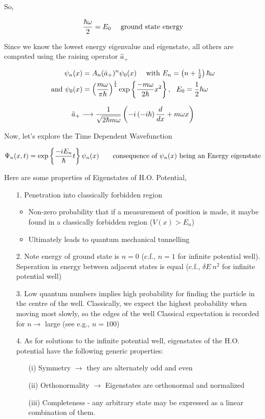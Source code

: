 \documentclass[english, 11pt]{article}
\begin{document}
       So,

       \[ \f{\hbar\omega}{2} = E_0 \ \ \ \ \mbox{ground state energy} \]

       Since we know the lowest energy eigenvalue and eigenstate, all others are computed using the raising operator $\hat{a}_+$

       \begin{align*}
         \psi_n(x) & = A_n (\hat{a}_+)^n\psi_0(x) \ \ \ \ \mbox{with $E_n = \left( n + \frac{1}{2} \right) \hbar \omega$} \\
         \mbox{and } \psi_0(x) & = \left( \frac{m\omega}{\pi\hbar} \right)^{\frac{1}{4}}\exp \left\{ \frac{-m\omega}{2\hbar}x^2 \right\}, \ \ E_0 = \frac{1}{2}\hbar\omega
       \end{align*}

       \[ \hat{a}_+ \longrightarrow \frac{1}{\sqrt{2\hbar m \omega}} \left( -i \left( -i\hbar \right) \frac{d}{dx} + m\omega x \right) \]

       Now, let's explore the Time Dependent Wavefunction

       \[ \Psi_n(x,t) = \exp \left\{ \frac{-iE_n}{\hbar}t \right\}\psi_n(x) \ \ \ \ \ \ \mbox{consequence of $\psi_n(x)$ being an Energy eigenstate} \]

       Here are some properties of Eigenstates of H.O. Potential,

       \begin{itemize}
         \item[1.] Penetration into classically forbidden region
         \begin{itemize}
           \item Non-zero probability that if a measurement of position is made, it maybe found in  a classically forbidden region ($V(x) > E_n$)
           \item Ultimately leads to quantum mechanical tunnelling
         \end{itemize}
        \item[2.] Note energy of ground state is $n = 0$ (c.f., $n = 1$ for infinite potential well). Seperation in energy between adjacent states is equal (c.f., $\delta E ~ n^2$ for infinite potential well)
        \item[3.] Low quantum numbers implies high probability for finding the particle in the centre of the well. Classically, we expect the highest probability when moving most slowly, so the edges of the well Classical expectation is recorded for $n \longrightarrow$ large (see e.g., $n = 100$)
        \item[4.] As for solutions to the infinite potential well, eigenstates of the H.O. potential have the following generic properties:
        \begin{itemize}
          \item[(i)] Symmetry $\longrightarrow$ they are alternately odd and even
          \item[(ii)] Orthonormality $\longrightarrow$ Eigenstates are orthonormal and normalized
          \item[(iii)] Completeness - any arbitrary state may be expressed as a linear combination of them.
        \end{itemize}
       \end{itemize}
\end{document}
